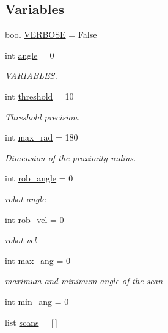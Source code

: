 \subsection*{Variables}
\begin{DoxyCompactItemize}
\item 
bool \hyperlink{namespacePerception_a45c9a255f6f96422822a1134c6200451}{V\+E\+R\+B\+O\+SE} = False
\item 
int \hyperlink{namespacePerception_a30f922540fc81da4abe1a1cf48cf96ac}{angle} = 0
\begin{DoxyCompactList}\small\item\em V\+A\+R\+I\+A\+B\+L\+ES. \end{DoxyCompactList}\item 
int \hyperlink{namespacePerception_a9f6f9cf6f9b5895bb39924b3682a262b}{threshold} = 10
\begin{DoxyCompactList}\small\item\em Threshold precision. \end{DoxyCompactList}\item 
int \hyperlink{namespacePerception_a25e59ac83c977a1cd1752b677923c0d8}{max\+\_\+rad} = 180
\begin{DoxyCompactList}\small\item\em Dimension of the proximity radius. \end{DoxyCompactList}\item 
int \hyperlink{namespacePerception_a6f826a3f390ba3a185e2aa8a43013701}{rob\+\_\+angle} = 0
\begin{DoxyCompactList}\small\item\em robot angle \end{DoxyCompactList}\item 
int \hyperlink{namespacePerception_ad0534f9c1df13d7a2b48ff2a983f0cc6}{rob\+\_\+vel} = 0
\begin{DoxyCompactList}\small\item\em robot vel \end{DoxyCompactList}\item 
int \hyperlink{namespacePerception_a32c9e49968ea4ea21f1afbe28dc236cc}{max\+\_\+ang} = 0
\begin{DoxyCompactList}\small\item\em maximum and minimum angle of the scan \end{DoxyCompactList}\item 
int \hyperlink{namespacePerception_a0aca0fa8eb3415fe07777168f37774ff}{min\+\_\+ang} = 0
\item 
list \hyperlink{namespacePerception_a649811d3cb5680f5481c7d612e159825}{scans} = \mbox{[}$\,$\mbox{]}

\end{DoxyCompactItemize}
